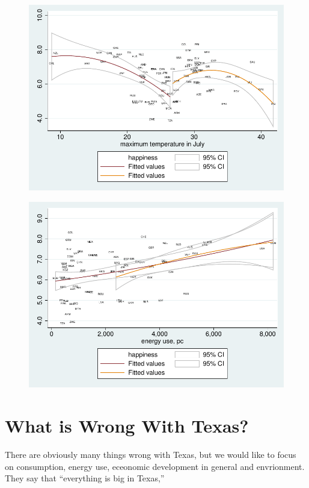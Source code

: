 \documentclass[10pt, letterpaper]{article}
\begin{document}
\begin{spacing}{1.4}
\begin{figure}[H]
 \includegraphics[width=6in]{graphsAndTables/JulTwice.pdf}\centering
\caption{}\label{JulTwice}
 \end{figure}

\begin{figure}[H]
 \includegraphics[width=6in]{graphsAndTables/eneTwice.pdf}\centering
\caption{}\label{eneTwice}
 \end{figure}




\section{What is Wrong With Texas?}

There are obviously many things wrong with Texas, but we would like to focus on
consumption, energy use, eceonomic development in general and envrionment. They
say that ``everything is big in Texas,'' 


\end{spacing}
\end{document}
